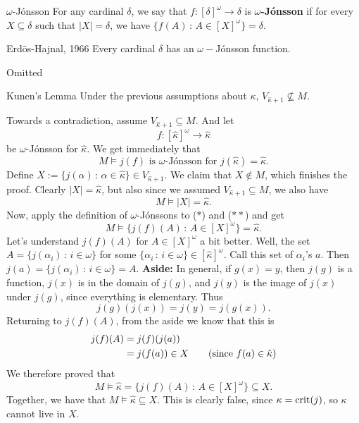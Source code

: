 \documentclass{article}
\begin{document}
\begin{fancydefine}{$\omega$-J\'onsson}
    For any cardinal $\delta$, we say that $f: [\delta]^{\omega} \to \delta$ is $\omega$\textbf{-J\'onsson} if for every $X \subseteq \delta$ such that $|X|=\delta$, we have $\{f(A) \, : \, A \in [X]^{\omega}\}=\delta$. %
\end{fancydefine}
\begin{fancylem}{Erd\"os-Hajnal, 1966}
    Every cardinal $\delta$ has an $\omega-$J\'onsson function.
\end{fancylem}
\proof Omitted \endproof 
\newlec 
\begin{fancylem}{Kunen's Lemma}
    Under the previous assumptions about $\kappa$, $V_{\hat{\kappa}+1} \nsubseteq M$.
\end{fancylem}
\proof Towards a contradiction, assume $V_{\hat{\kappa}+1} \subseteq M$. And let \[ f : [\hat{\kappa}]^{\omega} \to \hat{\kappa}\] be $\omega$-J\'onsson for $\hat{\kappa}$. We get immediately that \[ M \models j(f) \text{ is $\omega$-J\'onsson for $j(\hat{\kappa})=\hat{\kappa}$.} \tag{$*$}\]
Define $X := \{ j(\alpha) \, : \, \alpha \in \hat{\kappa}\} \in V_{\hat{\kappa}+1}$. We claim that $X \notin M$, which finishes the proof. \gap 
Clearly $|X|= \hat{\kappa}$, but also since we assumed $V_{\hat{\kappa}+1} \subseteq M$, we also have \[ M \models |X| = \hat{\kappa}. \tag{$**$}\] Now, apply the definition of $\omega$-J\'onssons to ($*$) and ($**$) and get \[ M \models \{ j(f)(A) \, : \, A \in [X]^{\omega}\} = \hat{\kappa}.\] 
Let's understand $j(f)(A)$ for $A \in [X]^{\omega}$ a bit better. Well, the set $A = \{ j(\alpha_{i}) \, : \, i \in \omega\}$ for some $\{\alpha_{i} \, : \, i \in \omega\} \in [\hat{\kappa}]^{\omega}$. Call this set of $\alpha_{i}$'s $a$. Then $j(a) = \{j(\alpha_{i}) \, : \, i \in \omega\} = A$.\gap
\textbf{Aside:} In general, if $g(x)=y$, then $j(g)$ is a function, $j(x)$ is in the domain of $j(g)$, and $j(y)$ is the image of $j(x)$ under $j(g)$, since everything is elementary. Thus \[ j(g)(j(x)) = j(y) = j(g(x)).\]
Returning to $j(f)(A)$, from the aside we know that this is \begin{align*}
    j(f)(A) &= j(f)(j(a))\\
    &= j(f(a)) \in X \tag{since $f(a) \in \hat{\kappa}$}
\end{align*}
We therefore proved that \[ M \models \hat{\kappa} = \{j(f)(A) \, : \, A \in [X]^{\omega}\} \subseteq X.\]
Together, we have that $M \models \hat{\kappa} \subseteq X$. This is clearly false, since $\kappa=\operatorname{crit}(j)$, so $\kappa$ cannot live in $X$.
\end{document}
